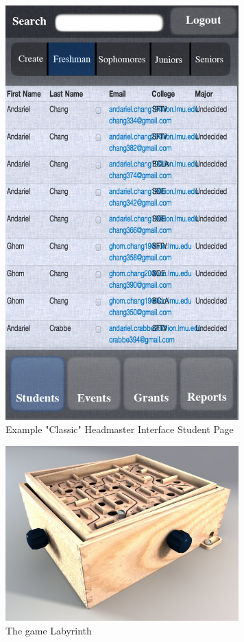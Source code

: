 \documentclass{article}
\begin{document}
\begin{figure}
\centering
\includegraphics[width=90mm]{classic-students.jpg}
\caption{Example "Classic" Headmaster Interface Student Page}
\label{overflow}
\end{figure}

\begin{figure}
\centering
\includegraphics[width=90mm]{labyrinth.jpeg}
\caption{The game Labyrinth}
\label{overflow}
\end{figure}
\end{document}
